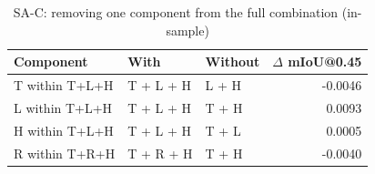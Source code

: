 \begin{table}[H]\centering\scriptsize\setlength{\tabcolsep}{3pt}
\begin{tabular}{>{\raggedright\arraybackslash}p{3.06cm}>{\raggedright\arraybackslash}p{2.11cm}>{\raggedright\arraybackslash}p{1.73cm}r}
\toprule
Component & With & Without & $\Delta$ mIoU@0.45 \\
\midrule
T within T+L+H & T + L + H & L + H & -0.0046 \\
L within T+L+H & T + L + H & T + H & 0.0093 \\
H within T+L+H & T + L + H & T + L & 0.0005 \\
R within T+R+H & T + R + H & T + H & -0.0040 \\
\bottomrule
\end{tabular}
\caption{SA-C: removing one component from the full combination (in-sample)}\label{tab:a6_sa_c_components}
\end{table}
